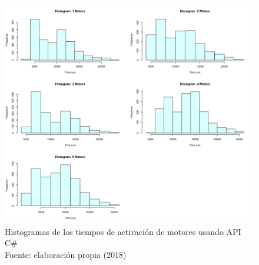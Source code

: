 \begin{figure}
 \begin{center} 
   	\includegraphics[width=1.0\textwidth]{evaluation/graphics/Xamarin/Galaxy-APITest/HistMotorsXamarinGalaxy-APITest.png}
   \centering
   \captionsetup{justification=centering}
    \caption[Histogramas de los tiempos de activación de motores usando API C\# ]{Histogramas de los tiempos de activación de motores usando API C\# \\Fuente: elaboración propia (2018)} 
    \label{fig:xamarin-galaxy-hist-motors-api}
  \end{center}
\end{figure}

